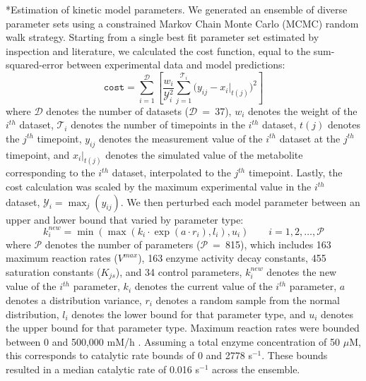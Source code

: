 \documentclass[12pt]{article}
\makeatletter
\renewcommand\subsection{\@startsection
	{subsection}{2}{0mm}
	{-0.05in}
	{-0.5\baselineskip}
	{\normalfont\normalsize\bfseries}}
\makeatother
\begin{document}
\subsection*{Estimation of kinetic model parameters.}
We generated an ensemble of diverse parameter sets using a constrained Markov Chain Monte Carlo (MCMC) random walk strategy.
Starting from a single best fit parameter set estimated by inspection and literature,
we calculated the cost function, equal to the sum-squared-error between experimental data and model predictions:
\begin{equation}\label{eqn:cost-function}
    \texttt{cost}=\sum_{i=1}^{\mathcal{D}}\left[\frac{w_i}{\mathcal{Y}_{i}^2}\sum_{j=1}^{\mathcal{T}_i}\bigg(y_{ij}-x_{i}|_{t(j)}\bigg)^2 \right]
\end{equation}
where $\mathcal{D}$ denotes the number of datasets ($\mathcal{D}$~=~37),
$w_i$ denotes the weight of the $i^{th}$ dataset,
$\mathcal{T}_i$ denotes the number of timepoints in the $i^{th}$ dataset,
$t(j)$ denotes the $j^{th}$ timepoint, $y_{ij}$ denotes the measurement value of the $i^{th}$ dataset at the $j^{th}$ timepoint,
and $x_{i}|_{t(j)}$ denotes the simulated value of the metabolite corresponding to the $i^{th}$ dataset, interpolated to the $j^{th}$ timepoint.
Lastly, the cost calculation was scaled by the maximum experimental value in the $i^{th}$ dataset, $\mathcal{Y}_{i}=\max_{j}\left(y_{ij}\right)$.
We then perturbed each model parameter between an upper and lower bound that varied by parameter type:
\begin{equation}\label{eqn:parameter-perturbation}
    k_i^{new}=\min\left(\max\left(k_i \cdot \exp(a \cdot r_i),l_i\right),u_i\right)\qquad{i=1,2,\hdots,\mathcal{P}}
\end{equation}
where $\mathcal{P}$ denotes the number of parameters ($\mathcal{P}$~=~815), which includes 163 maximum reaction rates ($V^{max}$), 163 enzyme activity decay constants, 455 saturation constants ($K_{js}$), and 34 control parameters, $k_i^{new}$ denotes the new value of the $i^{th}$ parameter, $k_i$ denotes the current value of the $i^{th}$ parameter, $a$ denotes a distribution variance, $r_i$ denotes a random sample from the normal distribution, $l_i$ denotes the lower bound for that parameter type, and $u_i$ denotes the upper bound for that parameter type.
Maximum reaction rates were bounded between 0 and 500,000 mM/h \cite{Keseler:2013aa}.
Assuming a total enzyme concentration of 50 $\mu$M, this corresponds to catalytic rate bounds of 0 and 2778 s$^{-1}$.
These bounds resulted in a median catalytic rate of 0.016 s$^{-1}$ across the ensemble.
\end{document}
